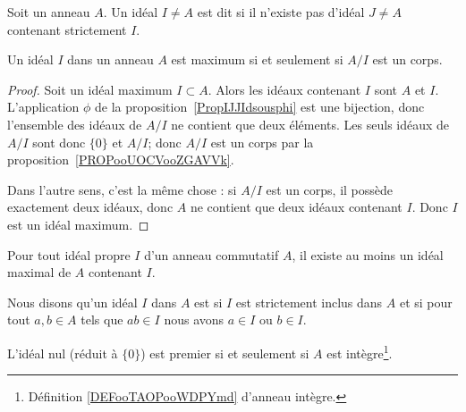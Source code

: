 \begin{definition}      \label{DEFIdealMax}
	Soit un anneau \( A\). Un idéal \( I\neq A\) est dit  si il n'existe pas d'idéal \( J\neq A\) contenant strictement \( I\).
\end{definition}

\begin{proposition}     \label{PROPooSHHWooCyZPPw}
	Un idéal \( I\) dans un anneau \( A \) est maximum si et seulement si \( A/I\) est un corps.
\end{proposition}

\begin{proof}
	Soit un idéal maximum \( I\subset A\). Alors les idéaux contenant \( I\) sont \( A\) et \( I\). L'application \( \phi\) de la proposition~\ref{PropIJJIdsousphi} est une bijection, donc l'ensemble des idéaux de \( A/I\) ne contient que deux éléments. Les seuls idéaux de \( A/I\) sont donc \( \{ 0 \}\) et \( A/I\); donc \( A/I\) est un corps par la proposition~\ref{PROPooUOCVooZGAVVk}.

	Dans l'autre sens, c'est la même chose : si \( A/I\) est un corps, il possède exactement deux idéaux, donc \( A\) ne contient que deux idéaux contenant \( I\). Donc \( I\) est un idéal maximum.
\end{proof}

\begin{theorem}      \label{THOooFWYLooOofaPa}
	Pour tout idéal propre \( I\) d'un anneau commutatif \( A\), il existe au moins un idéal maximal de \( A\) contenant \( I\).
\end{theorem}


\begin{definition}      \label{DEFooAQSZooVhvQWv}
	Nous disons qu'un idéal \( I\) dans \( A\) est  si \( I\) est strictement inclus dans \( A\) et si pour tout \( a,b\in A\) tels que \( ab\in I\) nous avons \( a\in I\) ou \( b\in I\).
\end{definition}

\begin{lemma}       \label{LEMooYRPBooYxXXsi}
	L'idéal nul (réduit à \( \{ 0 \}\)) est premier si et seulement si \( A\) est intègre\footnote{Définition \ref{DEFooTAOPooWDPYmd} d'anneau intègre.}.
\end{lemma}


